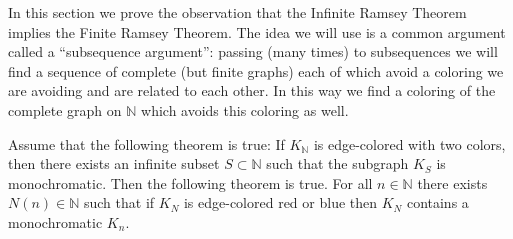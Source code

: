 In this section we prove the observation that the Infinite Ramsey Theorem implies the Finite Ramsey Theorem. The idea we will use is a common argument called a ``subsequence argument'': passing (many times) to subsequences we will find a sequence of complete (but finite graphs) each of which avoid a coloring we are avoiding and are related to each other. In this way we find a coloring of the complete graph on $\mathbb{N}$ which avoids this coloring as well.

\begin{theorem}
Assume that the following theorem is true: If $K_\mathbb{N}$ is edge-colored with two colors, then there exists an infinite subset $S \subset \mathbb{N}$ such that the subgraph $K_S$ is monochromatic. Then the following theorem is true. For all $n \in \mathbb{N}$ there exists $N(n) \in \mathbb{N}$ such that if $K_N$ is edge-colored red or blue then $K_N$ contains a monochromatic $K_n$.
\end{theorem}

